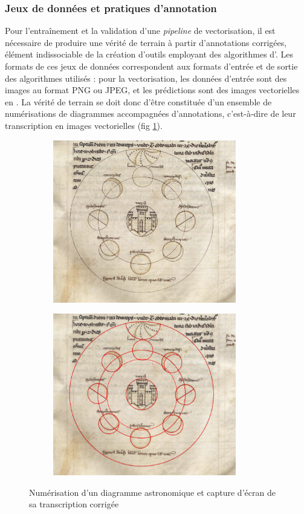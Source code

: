     \subsubsection{Jeux de données et pratiques d'annotation}
    Pour l'entraînement et la validation d'une \textit{pipeline} de vectorisation, il est nécessaire de produire une vérité de terrain à partir d'annotations corrigées, élément indissociable de la création d'outils employant des algorithmes d'\ia. Les formats de ces jeux de données correspondent aux formats d'entrée et de sortie des algorithmes utilisés : pour la vectorisation, les données d'entrée sont des images au format PNG ou JPEG, et les prédictions sont des images vectorielles en \svg. La vérité de terrain se doit donc d'être constituée d'un ensemble de numérisations de diagrammes accompagnées d'annotations, c'est-à-dire de leur transcription en images vectorielles (fig \ref{fig:diagram_svg}).
    
    \begin{figure}[h]
    	\begin{subfigure}{0.5\linewidth}
    		\centering
    		\includegraphics[width=8cm]{images/diagram8.png}
    	\end{subfigure}
    	\hspace{1pt}
    	\begin{subfigure}{0.5\linewidth}
    		\centering
    		\includegraphics[width=8cm]{images/diagram8_corr.png}
    	\end{subfigure}
    	\hspace{1pt}
    	\caption{Numérisation d'un diagramme astronomique et capture d'écran de sa transcription corrigée}
    	\label{fig:diagram_svg}
    \end{figure}

